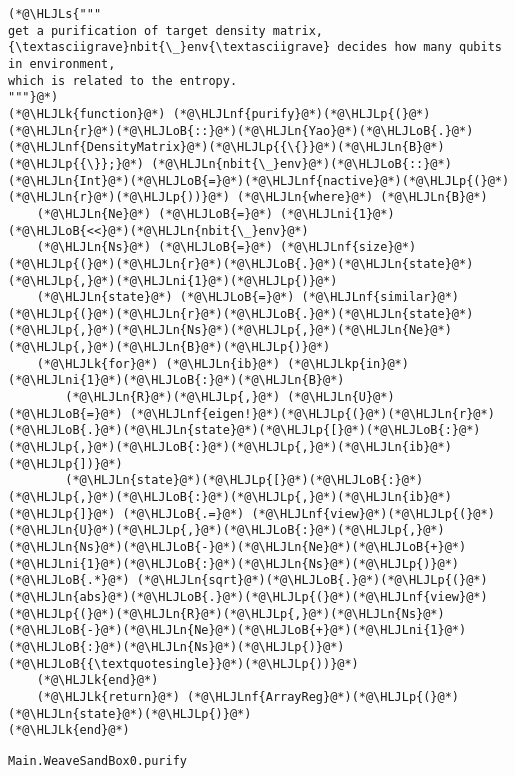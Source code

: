 \documentclass[11pt,a4paper]{article}
\newcommand{\HLJLk}[1]{\textcolor[RGB]{148,91,176}{\textbf{#1}}}
\newcommand{\HLJLkp}[1]{\textcolor[RGB]{148,91,176}{\textbf{#1}}}
\newcommand{\HLJLn}[1]{#1}
\newcommand{\HLJLnf}[1]{\textcolor[RGB]{66,102,213}{#1}}
\newcommand{\HLJLs}[1]{\textcolor[RGB]{201,61,57}{#1}}
\newcommand{\HLJLni}[1]{\textcolor[RGB]{59,151,46}{#1}}
\newcommand{\HLJLoB}[1]{\textcolor[RGB]{102,102,102}{\textbf{#1}}}
\newcommand{\HLJLp}[1]{#1}
\begin{document}
\begin{lstlisting}
(*@\HLJLs{"""
get a purification of target density matrix,
{\textasciigrave}nbit{\_}env{\textasciigrave} decides how many qubits in environment,
which is related to the entropy.
"""}@*)
(*@\HLJLk{function}@*) (*@\HLJLnf{purify}@*)(*@\HLJLp{(}@*)(*@\HLJLn{r}@*)(*@\HLJLoB{::}@*)(*@\HLJLn{Yao}@*)(*@\HLJLoB{.}@*)(*@\HLJLnf{DensityMatrix}@*)(*@\HLJLp{{\{}}@*)(*@\HLJLn{B}@*)(*@\HLJLp{{\}};}@*) (*@\HLJLn{nbit{\_}env}@*)(*@\HLJLoB{::}@*)(*@\HLJLn{Int}@*)(*@\HLJLoB{=}@*)(*@\HLJLnf{nactive}@*)(*@\HLJLp{(}@*)(*@\HLJLn{r}@*)(*@\HLJLp{))}@*) (*@\HLJLn{where}@*) (*@\HLJLn{B}@*)
    (*@\HLJLn{Ne}@*) (*@\HLJLoB{=}@*) (*@\HLJLni{1}@*)(*@\HLJLoB{<<}@*)(*@\HLJLn{nbit{\_}env}@*)
    (*@\HLJLn{Ns}@*) (*@\HLJLoB{=}@*) (*@\HLJLnf{size}@*)(*@\HLJLp{(}@*)(*@\HLJLn{r}@*)(*@\HLJLoB{.}@*)(*@\HLJLn{state}@*)(*@\HLJLp{,}@*)(*@\HLJLni{1}@*)(*@\HLJLp{)}@*)
    (*@\HLJLn{state}@*) (*@\HLJLoB{=}@*) (*@\HLJLnf{similar}@*)(*@\HLJLp{(}@*)(*@\HLJLn{r}@*)(*@\HLJLoB{.}@*)(*@\HLJLn{state}@*)(*@\HLJLp{,}@*)(*@\HLJLn{Ns}@*)(*@\HLJLp{,}@*)(*@\HLJLn{Ne}@*)(*@\HLJLp{,}@*)(*@\HLJLn{B}@*)(*@\HLJLp{)}@*)
    (*@\HLJLk{for}@*) (*@\HLJLn{ib}@*) (*@\HLJLkp{in}@*) (*@\HLJLni{1}@*)(*@\HLJLoB{:}@*)(*@\HLJLn{B}@*)
        (*@\HLJLn{R}@*)(*@\HLJLp{,}@*) (*@\HLJLn{U}@*) (*@\HLJLoB{=}@*) (*@\HLJLnf{eigen!}@*)(*@\HLJLp{(}@*)(*@\HLJLn{r}@*)(*@\HLJLoB{.}@*)(*@\HLJLn{state}@*)(*@\HLJLp{[}@*)(*@\HLJLoB{:}@*)(*@\HLJLp{,}@*)(*@\HLJLoB{:}@*)(*@\HLJLp{,}@*)(*@\HLJLn{ib}@*)(*@\HLJLp{])}@*)
        (*@\HLJLn{state}@*)(*@\HLJLp{[}@*)(*@\HLJLoB{:}@*)(*@\HLJLp{,}@*)(*@\HLJLoB{:}@*)(*@\HLJLp{,}@*)(*@\HLJLn{ib}@*)(*@\HLJLp{]}@*) (*@\HLJLoB{.=}@*) (*@\HLJLnf{view}@*)(*@\HLJLp{(}@*)(*@\HLJLn{U}@*)(*@\HLJLp{,}@*)(*@\HLJLoB{:}@*)(*@\HLJLp{,}@*)(*@\HLJLn{Ns}@*)(*@\HLJLoB{-}@*)(*@\HLJLn{Ne}@*)(*@\HLJLoB{+}@*)(*@\HLJLni{1}@*)(*@\HLJLoB{:}@*)(*@\HLJLn{Ns}@*)(*@\HLJLp{)}@*) (*@\HLJLoB{.*}@*) (*@\HLJLn{sqrt}@*)(*@\HLJLoB{.}@*)(*@\HLJLp{(}@*)(*@\HLJLn{abs}@*)(*@\HLJLoB{.}@*)(*@\HLJLp{(}@*)(*@\HLJLnf{view}@*)(*@\HLJLp{(}@*)(*@\HLJLn{R}@*)(*@\HLJLp{,}@*)(*@\HLJLn{Ns}@*)(*@\HLJLoB{-}@*)(*@\HLJLn{Ne}@*)(*@\HLJLoB{+}@*)(*@\HLJLni{1}@*)(*@\HLJLoB{:}@*)(*@\HLJLn{Ns}@*)(*@\HLJLp{)}@*)(*@\HLJLoB{{\textquotesingle}}@*)(*@\HLJLp{))}@*)
    (*@\HLJLk{end}@*)
    (*@\HLJLk{return}@*) (*@\HLJLnf{ArrayReg}@*)(*@\HLJLp{(}@*)(*@\HLJLn{state}@*)(*@\HLJLp{)}@*)
(*@\HLJLk{end}@*)
\end{lstlisting}

\begin{lstlisting}
Main.WeaveSandBox0.purify
\end{lstlisting}
\end{document}
